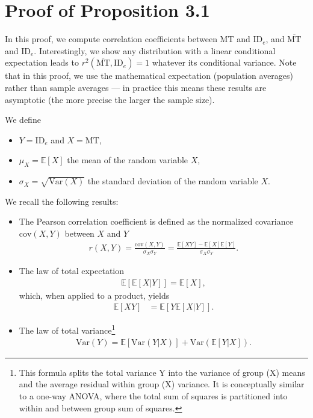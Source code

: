 \documentclass[acmlarge, manuscript,review]{acmart}
\newcommand{\mmt}{\ensuremath{\overline{\mt}}\xspace}
\newcommand{\mt}{\ensuremath{{\text{MT}}}\xspace}
\newcommand{\ide}{\ensuremath{{\text{ID}_e}}\xspace}
\begin{document}
\section{Proof of Proposition 3.1 \label{app:proofs}}
In this proof, we compute correlation coefficients between MT and \ide, and \mmt and \ide. Interestingly, we show any distribution with a linear conditional expectation leads to $r^2(\mmt, \ide) = 1$ whatever its conditional variance. Note that in this proof, we use the mathematical expectation (\ie population averages) rather than sample averages --- in practice this means these results are asymptotic (the more precise the larger the sample size).

We define
\begin{itemize}
  \item $Y=\ide$ and $X=\mt$,
  \item $\mu_X = \mathbb{E}[X]$ the mean of the random variable $X$,
  \item $\sigma_X = \sqrt{\text{Var}(X)}$ the standard deviation of the random variable $X$.
\end{itemize}
We recall the following results:
\begin{itemize}
  \item The Pearson correlation coefficient is defined as the normalized covariance $\text{cov}(X,Y)$ between $X$ and $Y$
    \begin{align}
      r(X,Y) = \frac{\text{cov}(X,Y)}{\sigma_X \sigma_Y} = \frac{\mathbb{E}[XY] - \mathbb{E}[X]\mathbb{E}[Y]}{\sigma_X \sigma_Y}. \label{eq:pearson_definition}
    \end{align}
  \item The law of total expectation
    \begin{align}
      \mathbb{E}[\mathbb{E}[X|Y]] = \mathbb{E}[X],
    \end{align}
    which, when applied to a product, yields
    \begin{align}
      \mathbb{E}[XY] & = \mathbb{E}[Y\mathbb{E}[X|Y]].
    \end{align}
  \item The law of total variance\footnote{This formula splits the total variance Y into the variance of group (X) means and the average residual within group (X) variance. It is conceptually similar to a one-way ANOVA, where the total sum of squares is partitioned into within and between group sum of squares.}
    \begin{align}
      \text{Var}(Y) = \mathbb{E}[\text{Var}(Y|X)] + \text{Var}(\mathbb{E}[Y|X]).
    \end{align}
\end{itemize}
\end{document}

